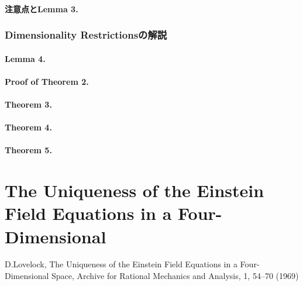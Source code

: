 \documentclass[12pt, a4paper]{jsarticle}
\begin{document}
\subsection{注意点とLemma 3.}
\section{Dimensionality Restrictionsの解説}

\subsection{Lemma 4.}

\subsection{Proof of Theorem 2.}

\subsection{Theorem 3.}

\subsection{Theorem 4.}

\subsection{Theorem 5.}

\part{The Uniqueness of the Einstein Field Equations in a Four-Dimensional}

\begin{thebibliography}{99}
   D.Lovelock, The Uniqueness of the Einstein Field Equations in a Four-Dimensional Space, Archive for Rational Mechanics and Analysis, 1, 54--70 (1969)
\end{thebibliography}
\end{document}
